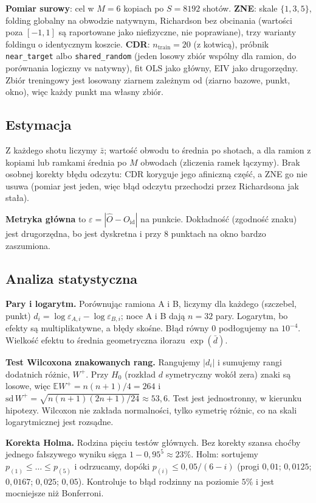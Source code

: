 \documentclass[11pt,a4paper]{article}
\newcommand{\Oid}{O_{\mathrm{id}}}
\newcommand{\E}{\mathbb{E}}
\begin{document}
\textbf{Pomiar surowy}: cel w $M=6$ kopiach po $S=8192$ shotów. \textbf{ZNE}: skale $\{1,3,5\}$,
folding globalny na obwodzie natywnym, Richardson bez obcinania (wartości poza $[-1,1]$ są
raportowane jako niefizyczne, nie poprawiane), trzy warianty foldingu o identycznym koszcie.
\textbf{CDR}: $n_{\text{train}}=20$ (z kotwicą), próbnik \texttt{near\_target} albo
\texttt{shared\_random} (jeden losowy zbiór wspólny dla ramion, do porównania logiczny vs natywny),
fit OLS jako główny, EIV jako drugorzędny. Zbiór treningowy jest losowany ziarnem zależnym od
(ziarno bazowe, punkt, okno), więc każdy punkt ma własny zbiór.

\subsection{Estymacja}

Z każdego shotu liczymy $\bar z$; wartość obwodu to średnia po shotach, a dla ramion z kopiami lub
ramkami średnia po $M$ obwodach (zliczenia ramek łączymy). Brak osobnej korekty błędu odczytu: CDR
koryguje jego afiniczną część, a ZNE go nie usuwa (pomiar jest jeden, więc błąd odczytu przechodzi
przez Richardsona jak stała).

\textbf{Metryka główna} to $\varepsilon=|\hat O-\Oid|$ na punkcie. Dokładność (zgodność znaku) jest
drugorzędna, bo jest dyskretna i przy 8 punktach na okno bardzo zaszumiona.

\subsection{Analiza statystyczna}

\textbf{Pary i logarytm.} Porównując ramiona A i B, liczymy dla każdego (szczebel, punkt)
$d_i=\log\varepsilon_{A,i}-\log\varepsilon_{B,i}$; noce A i B dają $n=32$ pary. Logarytm, bo efekty
są multiplikatywne, a błędy skośne. Błąd równy 0 podłogujemy na $10^{-4}$. Wielkość efektu to
średnia geometryczna ilorazu $\exp(\bar d)$.

\textbf{Test Wilcoxona znakowanych rang.} Rangujemy $|d_i|$ i sumujemy rangi dodatnich różnic,
$W^+$. Przy $H_0$ (rozkład $d$ symetryczny wokół zera) znaki są losowe, więc
$\E W^+=n(n+1)/4=264$ i $\mathrm{sd}\,W^+=\sqrt{n(n+1)(2n+1)/24}\approx53{,}6$. Test jest
jednostronny, w kierunku hipotezy. Wilcoxon nie zakłada normalności, tylko symetrię różnic, co na
skali logarytmicznej jest rozsądne.

\textbf{Korekta Holma.} Rodzina pięciu testów głównych. Bez korekty szansa choćby jednego
fałszywego wyniku sięga $1-0{,}95^5\approx23\%$. Holm: sortujemy $p_{(1)}\le\dots\le p_{(5)}$ i
odrzucamy, dopóki $p_{(i)}\le0{,}05/(6-i)$ (progi $0{,}01$; $0{,}0125$; $0{,}0167$; $0{,}025$;
$0{,}05$). Kontroluje to błąd rodzinny na poziomie $5\%$ i jest mocniejsze niż Bonferroni.
\end{document}
